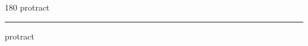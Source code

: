 
\begin{frame}
\begin{center}
\begin{turn}{180}
{\fontsize{2.5cm}{1em}\selectfont protract}
\end{turn}
\vspace{1em}\par  
\hrule
\vspace{1em}\par  
{\fontsize{2.5cm}{1em}\selectfont protract}
\end{center}
\end{frame}
